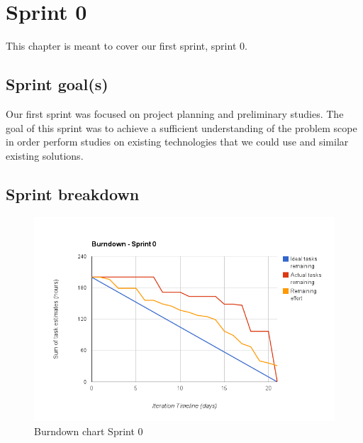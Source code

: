 

\chapter{Sprint 0}
\label{Sprint0}

This chapter is meant to cover our first sprint, sprint 0. 


\section{Sprint goal(s)}

Our first sprint was focused on project planning and preliminary studies.
The goal of this sprint was to achieve a sufficient understanding of the problem scope in order
perform studies on existing technologies that we could use and similar existing solutions.

\section{Sprint breakdown}

\begin{figure}[H]
\centering
\includegraphics[scale=0.50]{../Figures/burndownSprint0.png}
\caption{Burndown chart Sprint 0}
\label{figure:burndownsprint0}
\end{figure}



